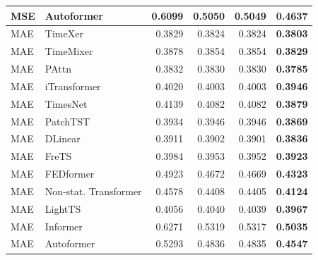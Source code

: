 \begin{longtable}{llrrrr}
MSE & Autoformer & 0.6099 & 0.5050 & 0.5049 & \textbf{0.4637} \\
\midrule
MAE & TimeXer & 0.3829 & 0.3824 & 0.3824 & \textbf{0.3803} \\
MAE & TimeMixer & 0.3878 & 0.3854 & 0.3854 & \textbf{0.3829} \\
MAE & PAttn & 0.3832 & 0.3830 & 0.3830 & \textbf{0.3785} \\
MAE & iTransformer & 0.4020 & 0.4003 & 0.4003 & \textbf{0.3946} \\
MAE & TimesNet & 0.4139 & 0.4082 & 0.4082 & \textbf{0.3879} \\
MAE & PatchTST & 0.3934 & 0.3946 & 0.3946 & \textbf{0.3869} \\
MAE & DLinear & 0.3911 & 0.3902 & 0.3901 & \textbf{0.3836} \\
MAE & FreTS & 0.3984 & 0.3953 & 0.3952 & \textbf{0.3923} \\
MAE & FEDformer & 0.4923 & 0.4672 & 0.4669 & \textbf{0.4323} \\
MAE & Non-stat. Transformer & 0.4578 & 0.4408 & 0.4405 & \textbf{0.4124} \\
MAE & LightTS & 0.4056 & 0.4040 & 0.4039 & \textbf{0.3967} \\
MAE & Informer & 0.6271 & 0.5319 & 0.5317 & \textbf{0.5035} \\
MAE & Autoformer & 0.5293 & 0.4836 & 0.4835 & \textbf{0.4547} \\
\end{longtable}
\endgroup

